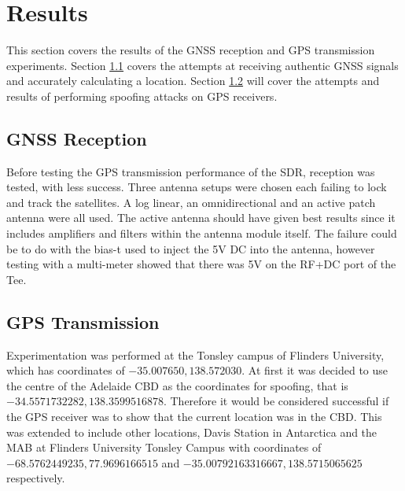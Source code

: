 
\chapter{Results} %

\label{Chapter5} %

This section covers the results of the GNSS reception and GPS transmission experiments. Section \ref{sec:Res_GNSSReception} covers the attempts at receiving authentic GNSS
signals and accurately calculating a location. Section \ref{sec:Res_GPSTransmission} will cover the attempts and results of performing spoofing attacks on GPS receivers.

\section{GNSS Reception} \label{sec:Res_GNSSReception}
Before testing the GPS transmission performance of the SDR, reception was tested, with less success. Three antenna setups were chosen each failing to lock and track the
satellites. A log linear, an omnidirectional and an active patch antenna were all used. The active antenna should have given best results since it includes amplifiers and
filters within the antenna module itself. The failure could be to do with the bias-t used to inject the 5V DC into the antenna, however testing with a multi-meter showed
that there was 5V on the RF+DC port of the Tee.


\section{GPS Transmission} \label{sec:Res_GPSTransmission}
Experimentation was performed at the Tonsley campus of Flinders University, which has coordinates of $-35.007650, 138.572030$. At first it was decided to use the
centre of the Adelaide CBD as the coordinates for spoofing, that is $-34.5571732282, 138.3599516878$. Therefore it would be considered successful if the GPS receiver was to show
that the current location was in the CBD. This was extended to include other locations, Davis Station in Antarctica and the MAB at Flinders University Tonsley Campus with
coordinates of $-68.5762449235, 77.9696166515$ and $-35.00792163316667, 138.5715065625$ respectively.

